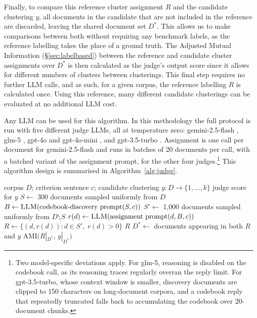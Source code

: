 \documentclass[11pt,a4paper,oneside]{report}
\begin{document}
Finally, to compare this reference cluster assignment $R$ and the candidate clustering $y$, all documents in the candidate that are not included in the reference are discarded, leaving the shared document set $D^{\ast}$. This allows us to make comparisons between both without requiring any benchmark labels, as the reference labelling takes the place of a ground truth. The Adjusted Mutual Information (\S\ref{sec:labelbased}) between the reference and candidate cluster assignments over $D^{\ast}$ is then calculated as the judge's output score since it allows for different numbers of clusters between clusterings. This final step requires no further LLM calls, and as such, for a given corpus, the reference labelling $R$ is calculated once. Using this reference, many different candidate clusterings can be evaluated at no additional LLM cost.

Any LLM can be used for this algorithm. In this methodology the full protocol is run with five different judge LLMs, all at temperature zero: {\small\ttfamily gemini-2.5-flash} \citep{geminiteam2025gemini25}, {\small\ttfamily glm-5} \citep{zhipu2026glm5}, {\small\ttfamily gpt-4o} and {\small\ttfamily gpt-4o-mini} \citep{openai2024gpt4o}, and {\small\ttfamily gpt-3.5-turbo} \citep{openai2023gpt35}. Assignment is one call per document for {\small\ttfamily gemini-2.5-flash} and runs in batches of 20 documents per call, with a batched variant of the assignment prompt, for the other four judges.\footnote{Two model-specific deviations apply. For {\small\ttfamily glm-5}, reasoning is disabled on the codebook call, as its reasoning traces regularly overran the reply limit. For {\small\ttfamily gpt-3.5-turbo}, whose context window is smaller, discovery documents are clipped to 150 characters on long-document corpora, and a codebook reply that repeatedly truncated falls back to accumulating the codebook over 20-document chunks.} This algorithm design is summarised in Algorithm~\ref{alg:judge}.

\begin{algorithm}[htbp]
\caption{The codebook judge}
\label{alg:judge}
\begin{algorithmic}[1]
\Require corpus $D$; criterion sentence $c$; candidate clustering $y : D \to \{1,\dots,k\}$
\Ensure  judge score for $y$
\Statex
{}
\State $S \gets$ 300 documents sampled uniformly from $D$
\State $B \gets \Call{LLM}{\text{codebook-discovery prompt}(S, c)}$ 
\State $S' \gets$ 1{,}000 documents sampled uniformly from $D \setminus S$
\State $r(d) \gets \Call{LLM}{\text{assignment prompt}(d, B, c)}$ 
\EndFor
\State $R \gets \{(d, r(d)) : d \in S',\; r(d) > 0\}$ 
\State \Return $R$
\EndProcedure
\Statex
{}
\State $D^\ast \gets$ documents appearing in both $R$ and $y$
\State \Return $\mathrm{AMI}\big(R|_{D^\ast},\, y|_{D^\ast}\big)$
\EndProcedure
\end{algorithmic}
\end{algorithm}
\end{document}
